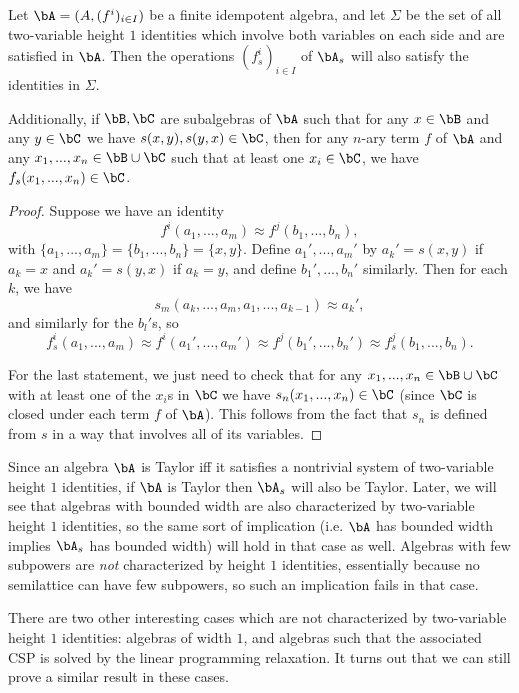 \begin{prop}\label{semilattice-preparation} Let $\bA = (A, (f^i)_{i \in I})$ be a finite idempotent algebra, and let $\Sigma$ be the set of all two-variable height $1$ identities which involve both variables on each side and are satisfied in $\bA$. Then the operations $(f^i_s)_{i \in I}$ of $\bA_s$ will also satisfy the identities in $\Sigma$.

Additionally, if $\bB, \bC$ are subalgebras of $\bA$ such that for any $x \in \bB$ and any $y \in \bC$ we have $s(x,y), s(y,x) \in \bC$, then for any $n$-ary term $f$ of $\bA$ and any $x_1, ..., x_n \in \bB \cup \bC$ such that at least one $x_i \in \bC$, we have $f_s(x_1, ..., x_n) \in \bC$.
\end{prop}
\begin{proof} Suppose we have an identity
\[
f^i(a_1, ..., a_m) \approx f^j(b_1, ..., b_n),
\]
with $\{a_1, ..., a_m\} = \{b_1, ..., b_n\} = \{x,y\}$. Define $a_1', ..., a_m'$ by $a_k' = s(x,y)$ if $a_k = x$ and $a_k' = s(y,x)$ if $a_k = y$, and define $b_1', ..., b_n'$ similarly. Then for each $k$, we have
\[
s_m(a_k, ..., a_m, a_1, ..., a_{k-1}) \approx a_k',
\]
and similarly for the $b_l'$s, so
\[
f^i_s(a_1, ..., a_m) \approx f^i(a_1', ..., a_m') \approx f^j(b_1', ..., b_n') \approx f^j_s(b_1, ..., b_n).
\]

For the last statement, we just need to check that for any $x_1, ..., x_n \in \bB\cup \bC$ with at least one of the $x_i$s in $\bC$ we have $s_n(x_1, ..., x_n) \in \bC$ (since $\bC$ is closed under each term $f$ of $\bA$). This follows from the fact that $s_n$ is defined from $s$ in a way that involves all of its variables.
\end{proof}

Since an algebra $\bA$ is Taylor iff it satisfies a nontrivial system of two-variable height $1$ identities, if $\bA$ is Taylor then $\bA_s$ will also be Taylor. Later, we will see that algebras with bounded width are also characterized by two-variable height $1$ identities, so the same sort of implication (i.e. $\bA$ has bounded width implies $\bA_s$ has bounded width) will hold in that case as well. Algebras with few subpowers are \emph{not} characterized by height $1$ identities, essentially because no semilattice can have few subpowers, so such an implication fails in that case.

There are two other interesting cases which are not characterized by two-variable height $1$ identities: algebras of width $1$, and algebras such that the associated CSP is solved by the linear programming relaxation. It turns out that we can still prove a similar result in these cases.

